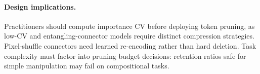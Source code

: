 \paragraph{Design implications.}
Practitioners should compute importance CV before deploying token pruning, as low-CV and entangling-connector models require distinct compression strategies. Pixel-shuffle connectors need learned re-encoding rather than hard deletion. Task complexity must factor into pruning budget decisions: retention ratios safe for simple manipulation may fail on compositional tasks.